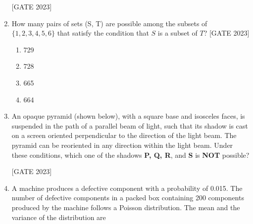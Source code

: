 \documentclass[journal,12pt,onecolumn]{IEEEtran}
\theoremstyle{remark}
\begin{document}
\begin{enumerate}
\vspace{1em}


\hfill{[GATE 2023]}\begin{enumerate}
\end{enumerate}
\item How many pairs of sets (S, T) are possible among the subsets of $ \{1, 2, 3, 4, 5, 6\} $ that satisfy the condition that $ S $ is a subset of $ T $?
\hfill{[GATE 2023]}
\begin{multicols}{2}
\begin{enumerate}
   \item 729
   \item 728
   \item 665
   \item 664
\end{enumerate}
\end{multicols}

\item An opaque pyramid (shown below), with a square base and isosceles faces, is suspended in the path of a parallel beam of light, such that its shadow is cast on a screen oriented perpendicular to the direction of the light beam. The pyramid can be reoriented in any direction within the light beam. Under these conditions, which one of the shadows \textbf{P, Q, R}, and \textbf{S} is \textbf{NOT} possible?

\begin{enumerate}
\end{enumerate}
\hfill{[GATE 2023]}\begin{enumerate}
\end{enumerate}
\item A machine produces a defective component with a probability of 0.015. The number of defective components in a packed box containing 200 components produced by the machine follows a Poisson distribution. The mean and the variance of the distribution are


\end{enumerate}
\end{document}
